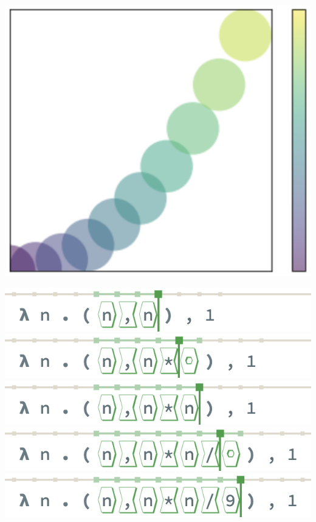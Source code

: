 \noindent
\begin{minipage}[t]{0.2\columnwidth}
  \includegraphics[width=\textwidth]{img/circles-parabola.png}
\end{minipage}
\hfill
\begin{minipage}{0.65\columnwidth}
  \includegraphics[width=\textwidth]{img/linear-insertion-0.png}
  \includegraphics[width=\textwidth]{img/linear-insertion-1.png}
  \includegraphics[width=\textwidth]{img/linear-insertion-2.png}
  \includegraphics[width=\textwidth]{img/linear-insertion-3.png}
  \includegraphics[width=\textwidth]{img/linear-insertion-4.png}
\end{minipage}

